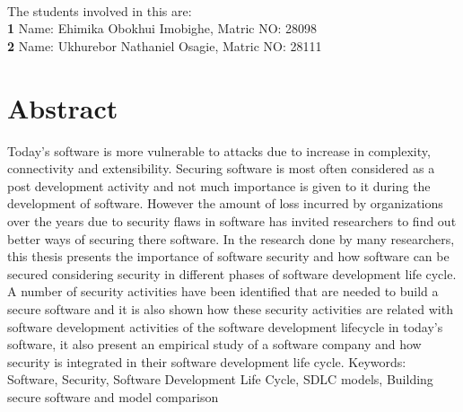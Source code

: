 \documentclass[12pt]{extreport}
\begin{document}
\vspace*{0.2in}


\begin{flushleft}
{\Large
\textbf{}
}
\newline

The students involved in this are: \textsuperscript{\textpilcrow}
\\
\bigskip
\textbf{1} Name: Ehimika Obokhui Imobighe, Matric NO: 28098
\\
\textbf{2} Name: Ukhurebor Nathaniel Osagie, Matric NO: 28111
\\
\bigskip

\end{flushleft}

\newpage
\section*{Abstract}
Today’s software is more vulnerable to attacks due to increase in complexity, connectivity and extensibility. Securing software is most often considered as a post development activity and not much importance is given to it during the development of software.
However the amount of loss incurred by organizations over the years due to security flaws in software has invited researchers to find out better ways of securing there software. In the research done by many researchers, this thesis presents the importance of software security and how software can be secured considering security in different phases of software development life cycle. A number of security activities have been identified that are needed to build a secure software and it is also shown  how these security activities are related with  software development activities of the software development lifecycle in today’s software,  it also present an empirical study of a software company and how security is integrated in their software development life cycle.
Keywords: Software, Security, Software Development Life Cycle, SDLC models, Building secure software and model comparison
\begin{flushleft}
	
\end{flushleft}

\newpage
\end{document}
